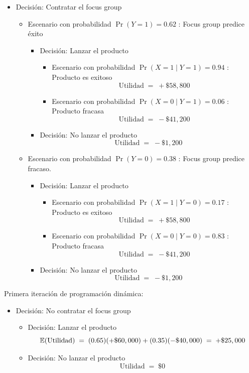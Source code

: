 \documentclass[ a4paper, twoside, 11pt]{article}
\begin{document}
\begin{problem}
\begin{itemize}
\item Decisi\'on: Contratar el focus group
\begin{itemize}

\item Escenario con probabilidad $\Pr(Y=1) = 0.62$ : Focus group predice \'exito
\begin{itemize}
\item Decisi\'on: Lanzar el producto
\begin{itemize}
\item Escenario con probabilidad $\Pr( X=1 \mid Y=1 ) = 0.94$ : Producto es exitoso
\[
\text{Utilidad} \; = \; +\$58,800
\]
\item Escenario con probabilidad $\Pr( X=0 \mid Y=1 ) = 0.06$ : Producto fracasa
\[
\text{Utilidad} \; = \; -\$41,200
\]
\end{itemize}
\item Decisi\'on: No lanzar el producto
\[
\text{Utilidad} \; = \; -\$1,200
\]
\end{itemize}

\item Escenario con probabilidad $\Pr(Y=0) = 0.38$ : Focus group predice fracaso.
\begin{itemize}
\item Decisi\'on: Lanzar el producto
\begin{itemize}
\item Escenario con probabilidad $\Pr( X=1 \mid Y=0 ) = 0.17$ : Producto es exitoso
\[
\text{Utilidad} \; = \; +\$58,800
\]
\item Escenario con probabilidad $\Pr( X=0 \mid Y=0 ) = 0.83$ : Producto fracasa
\[
\text{Utilidad} \; = \; -\$41,200
\]
\end{itemize}
\item Decisi\'on: No lanzar el producto
\[
\text{Utilidad} \; = \; -\$1,200
\]
\end{itemize}
\end{itemize}

\end{itemize}

Primera iteraci\'on de programaci\'on din\'amica: 
\begin{itemize}

\item Decisi\'on: No contratar el focus group
\begin{itemize}
\item Decisi\'on: Lanzar el producto
\[
\mathbb{E}(\text{Utilidad}) \; = \;
(0.65)(+\$60,000) + (0.35)(-\$40,000) \; = \; +\$25,000
\]
\item Decisi\'on: No lanzar el producto
\[
\text{Utilidad} \; = \; \$0
\]
\end{itemize}


\end{itemize}
\end{problem}
\end{document}

